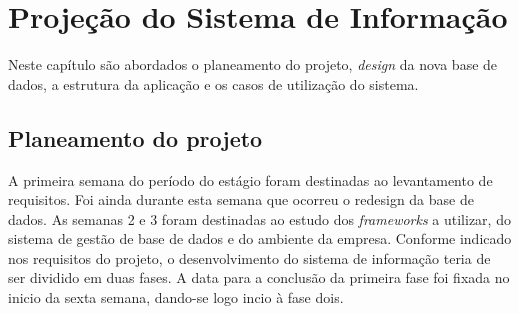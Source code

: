 \chapter{Projeção do Sistema de Informação} 
\label{cap:4}
Neste capítulo são abordados o planeamento do projeto, \textit{design} da nova base de dados, a estrutura da aplicação e os casos de utilização do sistema.

\section{Planeamento do projeto}
A primeira semana do período do estágio foram destinadas ao levantamento de requisitos. Foi ainda durante esta semana que ocorreu o redesign da base de dados.
As semanas 2 e 3 foram destinadas ao estudo dos \textit{frameworks} a utilizar, do sistema de gestão de base de dados e do ambiente da empresa.
Conforme indicado nos requisitos do projeto, o desenvolvimento do sistema de informação teria de ser dividido em duas fases. A data para a conclusão da primeira fase foi fixada no inicio da sexta semana, dando-se logo incio à fase dois.

